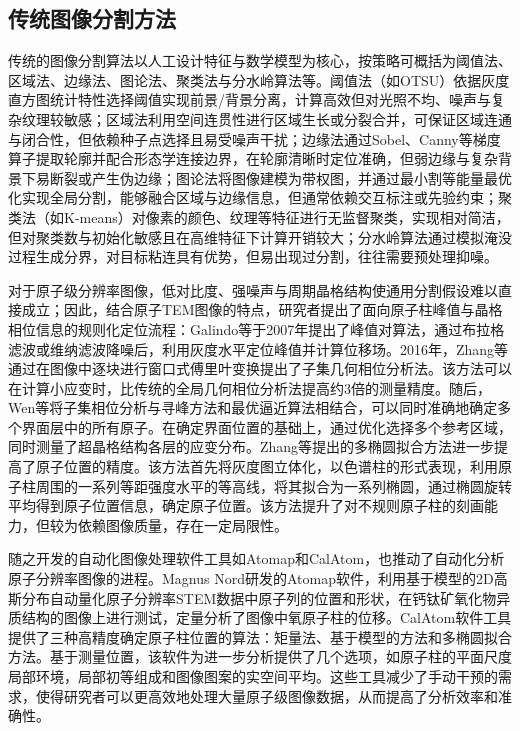 \subsection{传统图像分割方法}
传统的图像分割算法以人工设计特征与数学模型为核心，按策略可概括为阈值法、区域法、边缘法、图论法、聚类法与分水岭算法等。阈值法（如OTSU）依据灰度直方图统计特性选择阈值实现前景/背景分离\cite{杨晖2006图像分割的阈值法研究}，计算高效但对光照不均、噪声与复杂纹理较敏感；区域法利用空间连贯性进行区域生长或分裂合并\cite{tremeau1997region}，可保证区域连通与闭合性，但依赖种子点选择且易受噪声干扰；边缘法通过Sobel、Canny等梯度算子提取轮廓并配合形态学连接边界\cite{段瑞玲2005图像边缘检测方法研究综述}，在轮廓清晰时定位准确，但弱边缘与复杂背景下易断裂或产生伪边缘；图论法将图像建模为带权图，并通过最小割等能量最优化实现全局分割\cite{felzenszwalb2004efficient}，能够融合区域与边缘信息，但通常依赖交互标注或先验约束；聚类法（如K-means）对像素的颜色、纹理等特征进行无监督聚类\cite{dhanachandra2015image}，实现相对简洁，但对聚类数与初始化敏感且在高维特征下计算开销较大；分水岭算法通过模拟淹没过程生成分界\cite{vincent1991watersheds}，对目标粘连具有优势，但易出现过分割，往往需要预处理抑噪。

对于原子级分辨率图像，低对比度、强噪声与周期晶格结构使通用分割假设难以直接成立；因此，结合原子TEM图像的特点，研究者提出了面向原子柱峰值与晶格相位信息的规则化定位流程：Galindo等\cite{galindo2007peak}于2007年提出了峰值对算法，通过布拉格滤波或维纳滤波降噪后，利用灰度水平定位峰值并计算位移场。2016年，Zhang等\cite{zhang2016subset}通过在图像中逐块进行窗口式傅里叶变换提出了子集几何相位分析法。该方法可以在计算小应变时，比传统的全局几何相位分析法提高约3倍的测量精度。随后，Wen等\cite{wen2018quantitative}将子集相位分析与寻峰方法和最优逼近算法相结合，可以同时准确地确定多个界面层中的所有原子。在确定界面位置的基础上，通过优化选择多个参考区域，同时测量了超晶格结构各层的应变分布。Zhang等\cite{zhang2018multiple}提出的多椭圆拟合方法进一步提高了原子位置的精度。该方法首先将灰度图立体化，以色谱柱的形式表现，利用原子柱周围的一系列等距强度水平的等高线，将其拟合为一系列椭圆，通过椭圆旋转平均得到原子位置信息，确定原子位置。该方法提升了对不规则原子柱的刻画能力，但较为依赖图像质量，存在一定局限性。

随之开发的自动化图像处理软件工具如Atomap\cite{nord2017atomap}和CalAtom\cite{zhang2019calatom}，也推动了自动化分析原子分辨率图像的进程。Magnus Nord研发的Atomap软件，利用基于模型的2D高斯分布自动量化原子分辨率STEM数据中原子列的位置和形状，在钙钛矿氧化物异质结构的图像上进行测试，定量分析了图像中氧原子柱的位移。CalAtom软件工具提供了三种高精度确定原子柱位置的算法：矩量法、基于模型的方法和多椭圆拟合方法。基于测量位置，该软件为进一步分析提供了几个选项，如原子柱的平面尺度局部环境，局部初等组成和图像图案的实空间平均。这些工具减少了手动干预的需求，使得研究者可以更高效地处理大量原子级图像数据，从而提高了分析效率和准确性。


